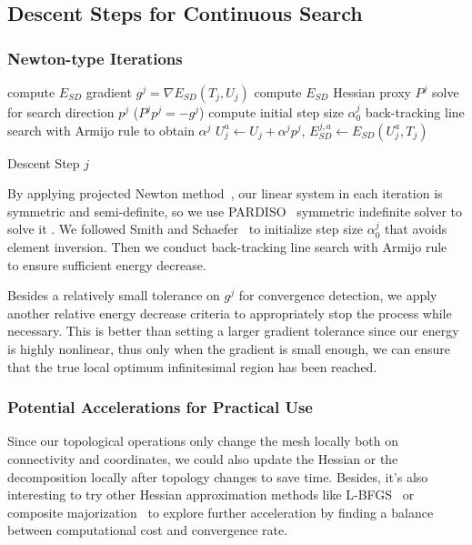 
\subsection{Descent Steps for Continuous Search}
\label{sec:descentStep}


\subsubsection{Newton-type Iterations}

\begin{algorithm}[h]
\SetAlgoLined
{}

compute $E_{SD}$ gradient $g^{j} = \nabla E_{SD}(T_{j}, U_{j})$\;
compute $E_{SD}$ Hessian proxy $P^j$\;
solve for search direction $p^j$ ($P^j p^j = -g^j$)\;
compute initial step size $\alpha^j_0$\;
back-tracking line search with Armijo rule to obtain $\alpha^j$\;
$U^a_{j} \leftarrow U_j + \alpha^j p^j$, $E^{j,a}_{SD} \leftarrow E_{SD}(U^a_{j}, T_{j})$\;

\caption{Descent Step $j$}
\end{algorithm}
By applying projected Newton method~\cite{Teran2005Robust}, our linear system in each iteration is symmetric and semi-definite, so we use PARDISO~\cite{pardiso-6.0a, pardiso-6.0b} symmetric indefinite solver to solve it . We followed Smith and Schaefer~ to initialize step size $\alpha^j_0$ that avoids element inversion. Then we conduct back-tracking line search with Armijo rule~\cite{Armijo1966Minimization} to ensure sufficient energy decrease.

Besides a relatively small tolerance on $g^j$ for convergence detection, we apply another relative energy decrease criteria to appropriately stop the process while necessary. This is better than setting a larger gradient tolerance since our energy is highly nonlinear, thus only when the gradient is small enough, we can ensure that the true local optimum infinitesimal region has been reached. 

\subsubsection{Potential Accelerations for Practical Use}

Since our topological operations only change the mesh locally both on connectivity and coordinates, we could also update the Hessian or the decomposition locally after topology changes to save time. Besides, it's also interesting to try other Hessian approximation methods like L-BFGS~\cite{Liu1989Limited} or composite majorization~\cite{Shtengel2017Geometric} to explore further acceleration by finding a balance between computational cost and convergence rate.


